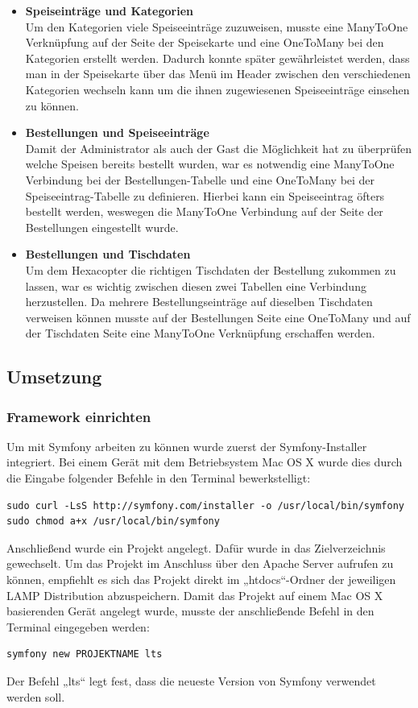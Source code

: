 \begin{itemize}
    \item \textbf{Speiseinträge und Kategorien}\\
Um den Kategorien viele Speiseeinträge zuzuweisen, musste eine ManyToOne Verknüpfung auf der Seite der Speisekarte und eine OneToMany bei den Kategorien erstellt werden. Dadurch konnte später gewährleistet werden, dass man in der Speisekarte über das Menü im Header zwischen den verschiedenen Kategorien wechseln kann um die ihnen zugewiesenen Speiseeinträge einsehen zu können.
    \item \textbf{Bestellungen und Speiseeinträge}\\
Damit der Administrator als auch der Gast die Möglichkeit hat zu überprüfen welche Speisen bereits bestellt wurden, war es notwendig eine ManyToOne Verbindung bei der Bestellungen-Tabelle und eine OneToMany bei der Speiseeintrag-Tabelle zu definieren. Hierbei kann ein Speiseeintrag öfters bestellt werden, weswegen die ManyToOne Verbindung auf der Seite der Bestellungen eingestellt wurde. 
    \item \textbf{Bestellungen und Tischdaten}\\ 
Um dem Hexacopter die richtigen Tischdaten der Bestellung zukommen zu lassen, war es wichtig zwischen diesen zwei Tabellen eine Verbindung herzustellen. Da mehrere Bestellungseinträge auf dieselben Tischdaten verweisen können musste auf der Bestellungen Seite eine OneToMany und auf der Tischdaten Seite eine ManyToOne Verknüpfung erschaffen werden.
  \end{itemize}  

  \subsection{Umsetzung}

    \subsubsection{Framework einrichten}

Um mit Symfony arbeiten zu können wurde zuerst der Symfony-Installer integriert. Bei einem Gerät mit dem Betriebsystem Mac OS X wurde dies durch die Eingabe folgender Befehle in den Terminal bewerkstelligt:
	\lstset{language = bash}
  	\begin{lstlisting}
sudo curl -LsS http://symfony.com/installer -o /usr/local/bin/symfony
sudo chmod a+x /usr/local/bin/symfony
  	\end{lstlisting}
Anschließend wurde ein Projekt angelegt. Dafür wurde in das Zielverzeichnis gewechselt. Um das Projekt im Anschluss über den Apache Server aufrufen zu können, empfiehlt es sich das Projekt direkt im „htdocs“-Ordner der jeweiligen LAMP Distribution abzuspeichern. Damit das Projekt auf einem Mac OS X basierenden Gerät angelegt wurde, musste der anschließende Befehl in den Terminal eingegeben werden:
	\lstset{language = bash}
  	\begin{lstlisting}
symfony new PROJEKTNAME lts
  	\end{lstlisting}
Der Befehl „lts“ legt fest, dass die neueste Version von Symfony verwendet werden soll.

